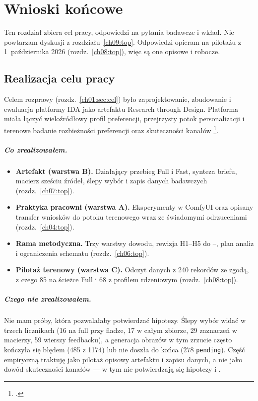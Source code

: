 \chapter{Wnioski końcowe}
\label{ch10:top}

Ten rozdział zbiera cel pracy, odpowiedzi na pytania badawcze i wkład. Nie powtarzam dyskusji z rozdziału~\ref{ch09:top}. Odpowiedzi opieram na pilotażu z 1~października 2026 (rozdz.~\ref{ch08:top}), więc są one opisowe i robocze.

\section{Realizacja celu pracy}
\label{ch10:sec:cel}

Celem rozprawy (rozdz.~\ref{ch01:sec:cel}) było zaprojektowanie, zbudowanie i ewaluacja platformy IDA jako artefaktu Research through Design. Platforma miała łączyć wieloźródłowy profil preferencji, przejrzysty potok personalizacji i terenowe badanie rozbieżności preferencji oraz skuteczności kanałów \footcite{idaPlatform2026}.

\paragraph{Co zrealizowałem.}
\begin{itemize}
  \item \textbf{Artefakt (warstwa B).} Działający przebieg Full i Fast, synteza briefu, macierz sześciu źródeł, ślepy wybór i zapis danych badawczych (rozdz.~\ref{ch07:top}).
  \item \textbf{Praktyka pracowni (warstwa A).} Eksperymenty w ComfyUI oraz opisany transfer wniosków do potoku terenowego wraz ze świadomymi odrzuceniami (rozdz.~\ref{ch04:top}).
  \item \textbf{Rama metodyczna.} Trzy warstwy dowodu, rewizja H1--H5 do --, plan analiz i ograniczenia schematu (rozdz.~\ref{ch06:top}).
  \item \textbf{Pilotaż terenowy (warstwa C).} Odczyt danych z 240 rekordów ze zgodą, z czego 85 na ścieżce Full i 68 z profilem rdzeniowym (rozdz.~\ref{ch08:top}).
\end{itemize}

\paragraph{Czego nie zrealizowałem.}
Nie mam próby, która pozwalałaby potwierdzać hipotezy. Ślepy wybór widać w trzech licznikach (16 na full przy fladze, 17 w całym zbiorze, 29 zaznaczeń w macierzy, 59 wierszy feedbacku), a generacja obrazów w tym zrzucie często kończyła się błędem (485 z 1174) lub nie doszła do końca (278 \texttt{pending}). Część empiryczną traktuję jako pilotaż opisowy artefaktu i zapisu danych, a nie jako dowód skuteczności kanałów --- w tym nie potwierdzają się hipotezy  i .

